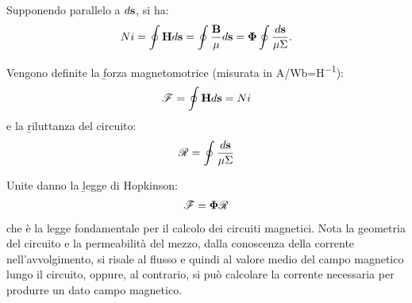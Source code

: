 Supponendo \dH parallelo a $d\mathbf{s}$, si ha:
\begin{equation}\begin{split}
Ni=\oint{\mathbf{H} d\mathbf{s}}=\oint{\frac{\mathbf{B}}{\mu} d\mathbf{s}}=\mathbf{\Phi}\oint{\frac{ d\mathbf{s}}{\mu\Sigma}}.
\end{split}\end{equation}

Vengono definite la \b{forza magnetomotrice} (misurata in \si{A/Wb}=\si{H^{-1}}):
\begin{equation}\begin{split}
\mathcal{F}=\oint{\mathbf{H} d\mathbf{s}}=Ni
\end{split}\end{equation}
e la \b{riluttanza del circuito}:
\begin{equation}\begin{split}
\mathcal{R}=\oint{\frac{ d\mathbf{s}}{\mu\Sigma}}
\end{split}\end{equation}

Unite danno la \b{legge di Hopkinson}:
\begin{equation}\begin{split}
\mathcal{F}=\mathbf{\Phi}\mathcal{R}
\end{split}\end{equation}
che è la legge fondamentale per il calcolo dei circuiti magnetici. Nota la geometria del circuito e la permeabilità del mezzo, dalla conoscenza della corrente nell'avvolgimento, si risale al flusso e quindi al valore medio del campo magnetico lungo il circuito, oppure, al contrario, si può calcolare la corrente necessaria per produrre un dato campo magnetico.


